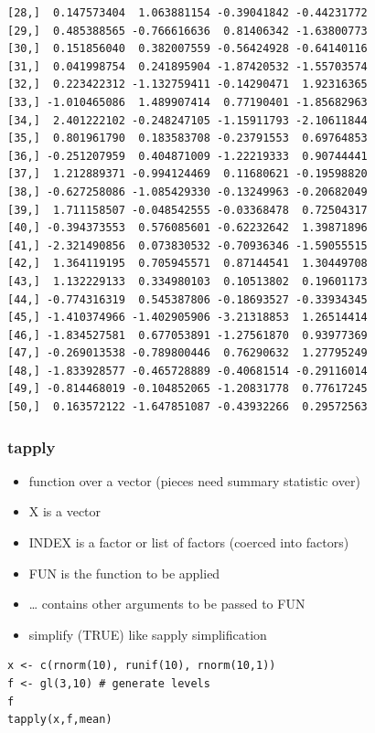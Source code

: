 \documentclass[11pt]{article}
\begin{document}
\begin{itemize}
\begin{verbatim}
[28,]  0.147573404  1.063881154 -0.39041842 -0.44231772
[29,]  0.485388565 -0.766616636  0.81406342 -1.63800773
[30,]  0.151856040  0.382007559 -0.56424928 -0.64140116
[31,]  0.041998754  0.241895904 -1.87420532 -1.55703574
[32,]  0.223422312 -1.132759411 -0.14290471  1.92316365
[33,] -1.010465086  1.489907414  0.77190401 -1.85682963
[34,]  2.401222102 -0.248247105 -1.15911793 -2.10611844
[35,]  0.801961790  0.183583708 -0.23791553  0.69764853
[36,] -0.251207959  0.404871009 -1.22219333  0.90744441
[37,]  1.212889371 -0.994124469  0.11680621 -0.19598820
[38,] -0.627258086 -1.085429330 -0.13249963 -0.20682049
[39,]  1.711158507 -0.048542555 -0.03368478  0.72504317
[40,] -0.394373553  0.576085601 -0.62232642  1.39871896
[41,] -2.321490856  0.073830532 -0.70936346 -1.59055515
[42,]  1.364119195  0.705945571  0.87144541  1.30449708
[43,]  1.132229133  0.334980103  0.10513802  0.19601173
[44,] -0.774316319  0.545387806 -0.18693527 -0.33934345
[45,] -1.410374966 -1.402905906 -3.21318853  1.26514414
[46,] -1.834527581  0.677053891 -1.27561870  0.93977369
[47,] -0.269013538 -0.789800446  0.76290632  1.27795249
[48,] -1.833928577 -0.465728889 -0.40681514 -0.29116014
[49,] -0.814468019 -0.104852065 -1.20831778  0.77617245
[50,]  0.163572122 -1.647851087 -0.43932266  0.29572563
\end{verbatim}

\end{itemize} %
\subsubsection{tapply}
\label{sec-2-4-5}

\begin{itemize}
\item function over a vector (pieces need  summary statistic over)
\item X is a vector
\item INDEX is a factor or list of factors (coerced into factors)
\item FUN is the function to be applied
\item \ldots{} contains other arguments to be passed to FUN
\item simplify (TRUE) like sapply simplification
\end{itemize}
 

\begin{verbatim}
x <- c(rnorm(10), runif(10), rnorm(10,1))
f <- gl(3,10) # generate levels
f
tapply(x,f,mean)
\end{verbatim}
\end{document}

